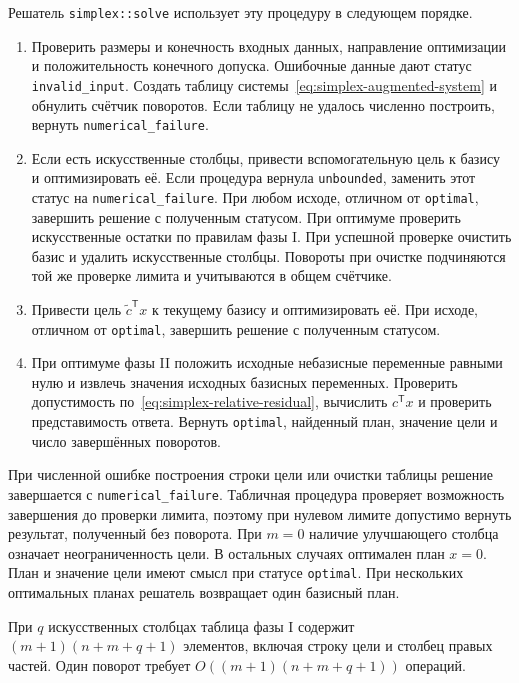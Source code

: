 Решатель \texttt{simplex::solve} использует эту процедуру в следующем порядке.
\begin{enumerate}
  \item Проверить размеры и конечность входных данных, направление
        оптимизации и положительность конечного допуска. Ошибочные
        данные дают статус \texttt{invalid\_input}. Создать таблицу
        системы~\eqref{eq:simplex-augmented-system} и обнулить счётчик
        поворотов. Если таблицу не удалось численно построить, вернуть
        \texttt{numerical\_failure}.
  \item Если есть искусственные столбцы, привести вспомогательную цель
        к базису и оптимизировать её. Если процедура вернула
        \texttt{unbounded}, заменить этот статус на
        \texttt{numerical\_failure}. При любом исходе, отличном
        от \texttt{optimal}, завершить решение с полученным статусом.
        При оптимуме проверить искусственные остатки по правилам
        фазы I. При успешной проверке очистить базис и удалить
        искусственные столбцы. Повороты при очистке подчиняются
        той же проверке лимита и учитываются в общем счётчике.
  \item Привести цель $\tilde c^{\mathsf T}x$ к текущему базису
        и оптимизировать её. При исходе, отличном от
        \texttt{optimal}, завершить решение с полученным статусом.
  \item При оптимуме фазы II положить исходные небазисные переменные
        равными нулю и извлечь значения исходных базисных переменных.
        Проверить допустимость по~\eqref{eq:simplex-relative-residual},
        вычислить $c^{\mathsf T}x$ и проверить представимость ответа.
        Вернуть \texttt{optimal}, найденный план, значение цели
        и число завершённых поворотов.
\end{enumerate}
При численной ошибке построения строки цели или очистки таблицы
решение завершается с \texttt{numerical\_failure}. Табличная процедура
проверяет возможность завершения до проверки лимита,
поэтому при нулевом лимите допустимо вернуть результат, полученный без
поворота. При $m=0$ наличие улучшающего столбца означает
неограниченность цели. В остальных случаях оптимален план $x=0$.
План и значение цели имеют смысл при статусе \texttt{optimal}.
При нескольких оптимальных планах решатель возвращает один базисный план.

При $q$ искусственных столбцах таблица фазы I содержит
$(m+1)(n+m+q+1)$ элементов, включая строку цели и столбец правых
частей. Один поворот требует $O((m+1)(n+m+q+1))$ операций.


